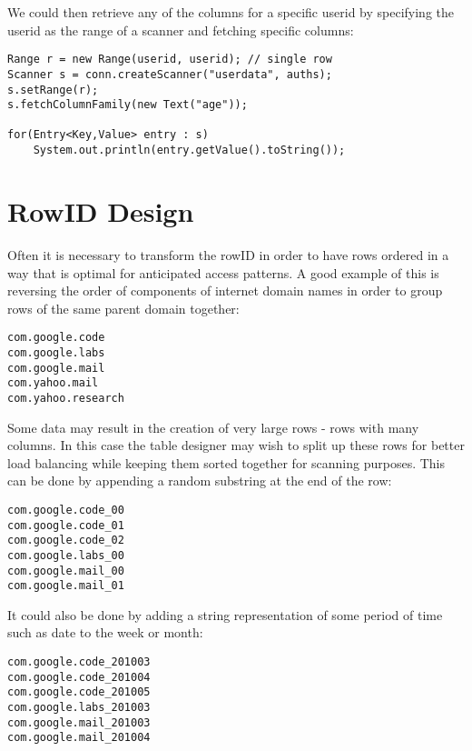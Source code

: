 We could then retrieve any of the columns for a specific userid by specifying the
userid as the range of a scanner and fetching specific columns:

\begingroup\fontsize{8pt}{8pt}\selectfont\begin{verbatim}
Range r = new Range(userid, userid); // single row
Scanner s = conn.createScanner("userdata", auths);
s.setRange(r);
s.fetchColumnFamily(new Text("age"));

for(Entry<Key,Value> entry : s)
    System.out.println(entry.getValue().toString());
\end{verbatim}\endgroup

\section{RowID Design}

Often it is necessary to transform the rowID in order to have rows ordered in a way
that is optimal for anticipated access patterns. A good example of this is reversing
the order of components of internet domain names in order to group rows of the
same parent domain together:

\begingroup\fontsize{8pt}{8pt}\selectfont\begin{verbatim}
com.google.code
com.google.labs
com.google.mail
com.yahoo.mail
com.yahoo.research
\end{verbatim}\endgroup

Some data may result in the creation of very large rows - rows with many columns.
In this case the table designer may wish to split up these rows for better load
balancing while keeping them sorted together for scanning purposes. This can be
done by appending a random substring at the end of the row:

\begingroup\fontsize{8pt}{8pt}\selectfont\begin{verbatim}
com.google.code_00
com.google.code_01
com.google.code_02
com.google.labs_00
com.google.mail_00
com.google.mail_01
\end{verbatim}\endgroup

It could also be done by adding a string representation of some period of time such as date to the week
or month:

\begingroup\fontsize{8pt}{8pt}\selectfont\begin{verbatim}
com.google.code_201003
com.google.code_201004
com.google.code_201005
com.google.labs_201003
com.google.mail_201003
com.google.mail_201004
\end{verbatim}\endgroup

